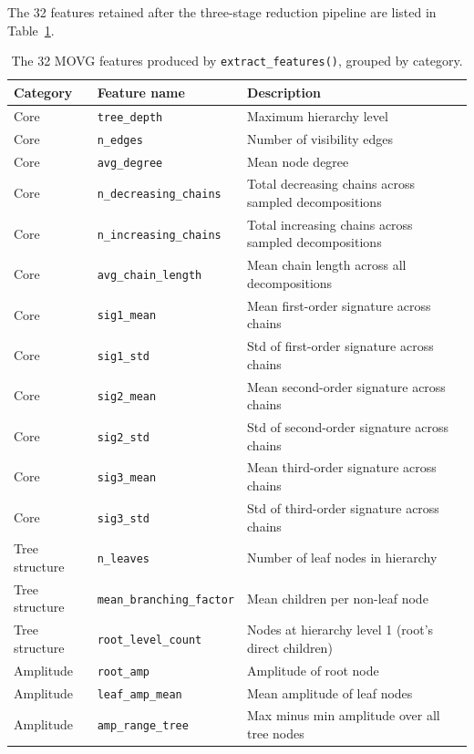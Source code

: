 \documentclass[a4paper,12pt]{article}
\begin{document}
The 32 features retained after the three-stage reduction pipeline are listed in Table~\ref{tab:feature_list}.

\begin{table}[ht]
\centering
\caption{The 32 MOVG features produced by \texttt{extract\_features()}, grouped by category.}
\label{tab:feature_list}
\begin{tabular}{llp{6.5cm}}
\toprule
Category & Feature name & Description \\
\midrule
Core & \texttt{tree\_depth} & Maximum hierarchy level \\
Core & \texttt{n\_edges} & Number of visibility edges \\
Core & \texttt{avg\_degree} & Mean node degree \\
Core & \texttt{n\_decreasing\_chains} & Total decreasing chains across sampled decompositions \\
Core & \texttt{n\_increasing\_chains} & Total increasing chains across sampled decompositions \\
Core & \texttt{avg\_chain\_length} & Mean chain length across all decompositions \\
Core & \texttt{sig1\_mean} & Mean first-order signature across chains \\
Core & \texttt{sig1\_std} & Std of first-order signature across chains \\
Core & \texttt{sig2\_mean} & Mean second-order signature across chains \\
Core & \texttt{sig2\_std} & Std of second-order signature across chains \\
Core & \texttt{sig3\_mean} & Mean third-order signature across chains \\
Core & \texttt{sig3\_std} & Std of third-order signature across chains \\
\midrule
Tree structure & \texttt{n\_leaves} & Number of leaf nodes in hierarchy \\
Tree structure & \texttt{mean\_branching\_factor} & Mean children per non-leaf node \\
Tree structure & \texttt{root\_level\_count} & Nodes at hierarchy level 1 (root's direct children) \\
\midrule
Amplitude & \texttt{root\_amp} & Amplitude of root node \\
Amplitude & \texttt{leaf\_amp\_mean} & Mean amplitude of leaf nodes \\
Amplitude & \texttt{amp\_range\_tree} & Max minus min amplitude over all tree nodes \\

\end{tabular}
\end{table}
\end{document}
